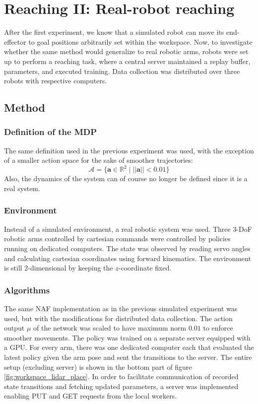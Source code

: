\chapter{Reaching II: Real-robot reaching}

After the first experiment, we know that a simulated robot can move its
end-effector to goal positions arbitrarily set within the workspace.  Now, to
investigate whether the same method would generalize to real robotic arms,
robots were set up to perform a reaching task, where a central server
maintained a replay buffer, parameters, and executed training.  Data collection
was distributed over three robots with respective computers.

\section{Method}

\subsection{Definition of the MDP}

The same definition used in the previous experiment was used, with the
exception of a smaller action space for the sake of smoother trajectories:
\begin{equation}
    \mathcal{A} = \lbrace \mathbf{a} \in \mathbb{R}^2 \mid ||\mathbf{a}|| < 0.01 \rbrace
\end{equation}
Also, the dynamics of the system can of course no longer be defined since
it is a real system.

\subsection{Environment}

Instead of a simulated environment, a real robotic system was used. Three 3-DoF
robotic arms controlled by cartesian commands were controlled by policies
running on dedicated computers. The state was observed by reading servo angles
and calculating cartesian coordinates using forward kinematics. The environment
is still 2-dimensional by keeping the $z$-coordinate fixed.

\subsection{Algorithms}

The same NAF implementation as in the previous simulated experiment was used,
but with the modifications for distributed data collection. The action output
$\mu$ of the network was scaled to have maximum norm $0.01$ to enforce smoother
movements. The policy was trained on a separate server equipped with a GPU. For
every arm, there was one dedicated computer each that evaluated the latest
policy given the arm pose and sent the transitions to the server.  The entire
setup (excluding server) is shown in the bottom part of figure
\ref{fig:workspace_lidar_place}. In order to facilitate communication of
recorded state transitions and fetching updated parameters, a server was
implemented enabling PUT and GET requests from the local workers.

